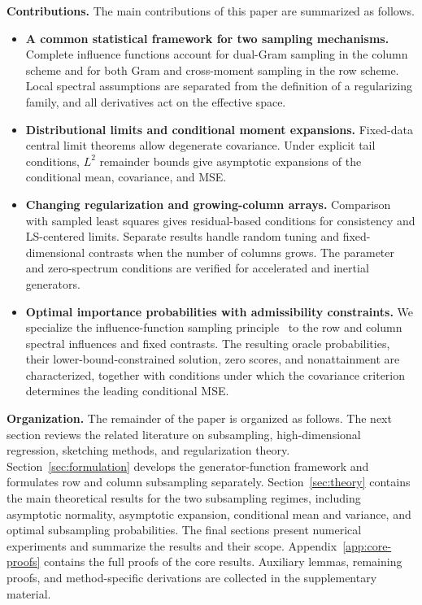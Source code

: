\documentclass[pdflatex,iicol,sn-mathphys-ay]{sn-jnl}
\theoremstyle{thmstyleone}
\theoremstyle{thmstylethree}
\theoremstyle{thmstyletwo}
\begin{document}
\medskip
\noindent\textbf{Contributions.}
The main contributions of this paper are summarized as follows.
\begin{itemize}
    \item \textbf{A common statistical framework for two sampling mechanisms.}
    Complete influence functions account for dual-Gram sampling in the column
    scheme and for both Gram and cross-moment sampling in the row scheme.
    Local spectral assumptions are separated from the definition of a
    regularizing family, and all derivatives act on the effective space.
    \item \textbf{Distributional limits and conditional moment expansions.}
    Fixed-data central limit theorems allow degenerate covariance.
    Under explicit tail conditions, $L^2$ remainder bounds give asymptotic
    expansions of the conditional mean, covariance, and MSE.
    \item \textbf{Changing regularization and growing-column arrays.}
    Comparison with sampled least squares gives residual-based conditions for
    consistency and LS-centered limits. Separate results handle random tuning
    and fixed-dimensional contrasts when the number of columns grows.
    The parameter and zero-spectrum conditions are verified for accelerated
    and inertial generators.
    \item \textbf{Optimal importance probabilities with admissibility constraints.}
    We specialize the influence-function sampling principle~\citep{ting2018optimal}
    to the row and column spectral influences and fixed contrasts.
    The resulting oracle probabilities, their lower-bound-constrained solution,
    zero scores, and nonattainment are characterized, together with conditions
    under which the covariance criterion determines the leading conditional MSE.
\end{itemize}

\medskip
\noindent\textbf{Organization.}
The remainder of the paper is organized as follows. The next section reviews the related literature on subsampling, high-dimensional regression, sketching methods, and regularization theory. Section~\ref{sec:formulation} develops the generator-function framework and formulates row and column subsampling separately. Section~\ref{sec:theory} contains the main theoretical results for the two subsampling regimes, including asymptotic normality, asymptotic expansion, conditional mean and variance, and optimal subsampling probabilities. The final sections present numerical experiments and summarize the results and their scope. Appendix~\ref{app:core-proofs} contains the full proofs of the core results. Auxiliary lemmas, remaining proofs, and method-specific derivations are collected in the supplementary material.
\end{document}

